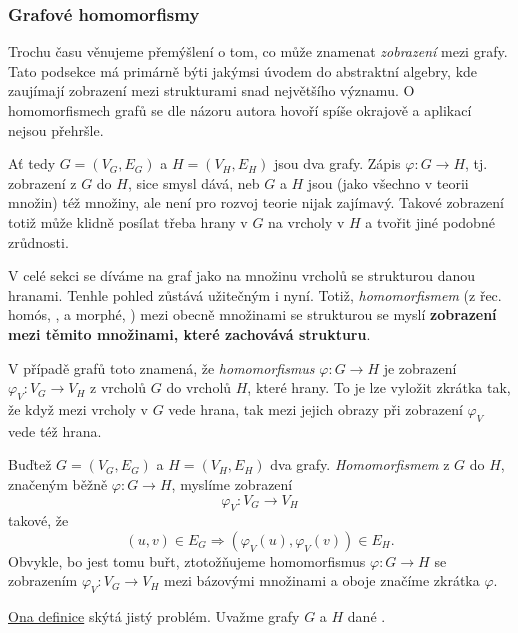 \subsubsection{Grafové homomorfismy}
\label{sssec:grafove-homomorfismy}

Trochu času věnujeme přemýšlení o tom, co může znamenat \emph{zobrazení} mezi
grafy. Tato podsekce má primárně býti jakýmsi úvodem do abstraktní algebry, kde
zaujímají zobrazení mezi strukturami snad největšího významu. O homomorfismech
grafů se dle názoru autora hovoří spíše okrajově a aplikací nejsou přehršle.

Ať tedy $G = (V_G,E_G)$ a $H = (V_H,E_H)$ jsou dva grafy. Zápis
$\varphi:G \to H$, tj. zobrazení z $G$ do $H$, sice smysl dává, neb $G$ a $H$
jsou (jako všechno v teorii množin) též množiny, ale není pro rozvoj teorie
nijak zajímavý. Takové zobrazení totiž může klidně posílat třeba hrany v $G$ na
vrcholy v $H$ a tvořit jiné podobné zrůdnosti.

V celé sekci se díváme na graf jako na množinu vrcholů se strukturou danou
hranami. Tenhle pohled zůstává užitečným i nyní. Totiž, \emph{homomorfismem} (z
řec. homós, , a morphé, ) mezi obecně množinami se
strukturou se myslí \textbf{zobrazení mezi těmito množinami, které zachovává
strukturu}.

V případě grafů toto znamená, že \emph{homomorfismus} $\varphi:G \to H$ je
zobrazení $\varphi_V:V_G \to V_H$ z vrcholů $G$ do vrcholů $H$, které
 hrany. To je lze vyložit zkrátka tak, že když mezi vrcholy v $G$
vede hrana, tak mezi jejich obrazy při zobrazení $\varphi_V$ vede též hrana.

\begin{definition}
 \label{def:grafovy-homomorfismus}
 Buďtež $G = (V_G,E_G)$ a $H = (V_H,E_H)$ dva grafy. \emph{Homomorfismem} z $G$
 do $H$, značeným běžně $\varphi:G \to H$, myslíme zobrazení
 \[
  \varphi_V:V_G \to V_H
 \]
 takové, že
 \[
  (u,v) \in E_G \Rightarrow (\varphi_V(u),\varphi_V(v)) \in E_H.
 \]
 Obvykle, bo jest tomu buřt, ztotožňujeme homomorfismus $\varphi:G \to H$ se
 zobrazením $\varphi_V:V_G \to V_H$ mezi bázovými množinami a oboje značíme
 zkrátka $\varphi$.
\end{definition}

\hyperref[def:grafovy-homomorfismus]{Ona definice} skýtá jistý problém. Uvažme
grafy $G$ a $H$ dané .

